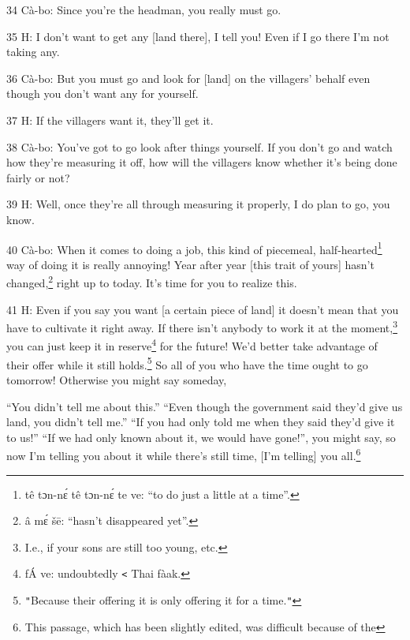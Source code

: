 34 Cà-bo: Since you're the headman, you really must go.

35 H: I don't want to get any [land there], I tell you! Even if I go there I'm
not taking any.

36 Cà-bo: But you must go and look for [land] on the villagers' behalf even though
you don't want any for yourself.

37 H: If the villagers want it, they'll get it.

38 Cà-bo: You've got to go look after things yourself. If you don't go and watch
how they're measuring it off, how will the villagers know whether it's being done
fairly or not?

39 H: Well, once they're all through measuring it properly, I do plan to go, you
know.

40 Cà-bo: When it comes to doing a job, this kind of piecemeal, half-hearted\footnote{tê tɔn-nɛ́ tê tɔn-nɛ́ te ve: ``to do just a little at a time''.}
way of doing it is really annoying! Year after year [this trait of yours] hasn't
changed,\footnote{â mɛ́ šē: ``hasn't disappeared yet''.} right up to today. It's time for you to realize this.

41 H: Even if you say you want [a certain piece of land] it doesn't mean that you
have to cultivate it right away. If there isn't anybody to work it at the moment,\footnote{I.e., if your sons are still too young, etc.}
you can just keep it in reserve\footnote{fÁ ve: undoubtedly \texttt{<} Thai fàak.} for the future! We'd better take advantage
of their offer while it still holds.\footnote{\texttt{"}Because their offering it is only offering it for a time.\texttt{"}} So all of you who have the time ought
to go tomorrow! Otherwise you might say someday,

``You didn't tell me about this.'' ``Even though the government said they'd give
us land, you didn't tell me.'' ``If you had only told me when they said they'd
give it to us!'' ``If we had only known about it, we would have gone!'', you might
say, so now I'm telling you about it while there's still time, [I'm telling] you
all.\footnote{This passage, which has been slightly edited, was difficult because of the}

